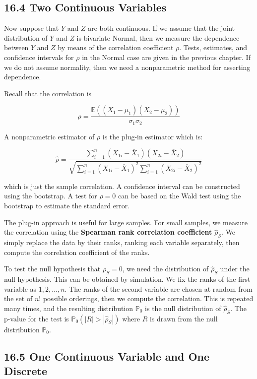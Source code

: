 \subsection*{16.4 Two Continuous
Variables}\label{two-continuous-variables}

Now suppose that \(Y\) and \(Z\) are both continuous. If we assume that
the joint distribution of \(Y\) and \(Z\) is bivariate Normal, then we
measure the dependence between \(Y\) and \(Z\) by means of the
correlation coefficient \(\rho\). Tests, estimates, and confidence
intervals for \(\rho\) in the Normal case are given in the previous
chapter. If we do not assume normality, then we need a nonparametric
method for asserting dependence.

Recall that the correlation is

\[\rho = \frac{\mathbb{E}((X_{1} - \mu_{1})(X_{2} - \mu_{2}))}{\sigma_{1} \sigma_{2}} \]

A nonparametric estimator of \(\rho\) is the plug-in estimator which is:

\[\hat{\rho} = \frac{\sum_{i=1}^{n} (X_{1i} - \overline{X}_{1})(X_{2i} - \overline{X}_{2})}{\sqrt{\sum_{i=1}^{n} (X_{1i} - \overline{X}_{1})^{2} \sum_{i=1}^{n} (X_{2i} - \overline{X}_{2})^{2}}} \]

which is just the sample correlation. A confidence interval can be
constructed using the bootstrap. A test for \(\rho = 0\) can be based on
the Wald test using the bootstrap to estimate the standard error.

The plug-in approach is useful for large samples. For small samples, we
measure the correlation using the \textbf{Spearman rank correlation
coefficient} \(\hat{\rho}_S\). We simply replace the data by their
ranks, ranking each variable separately, then compute the correlation
coefficient of the ranks.

To test the null hypothesis that \(\rho_S = 0\), we need the
distribution of \(\hat{\rho}_S\) under the null hypothesis. This can be
obtained by simulation. We fix the ranks of the first variable as
\(1, 2, \dots, n\). The ranks of the second variable are chosen at
random from the set of \(n!\) possible orderings, then we compute the
correlation. This is repeated many times, and the resulting distribution
\(\mathbb{P}_{0}\) is the null distribution of \(\hat{\rho}_S\). The
p-value for the test is \(\mathbb{P}_{0}(|R| > |\hat{\rho}_S|)\) where
\(R\) is drawn from the null distribution \(\mathbb{P}_{0}\).

\subsection*{16.5 One Continuous Variable and One
Discrete}\label{one-continuous-variable-and-one-discrete}

